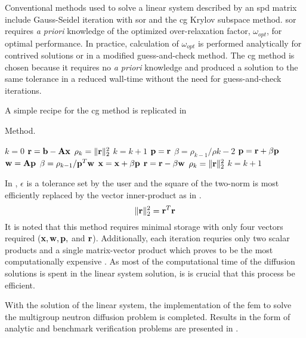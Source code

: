     Conventional methods used to solve a linear system described by an \gls{spd}
    matrix include Gauss-Seidel iteration with \gls{sor} and the \gls{cg} Krylov 
    subspace method. \gls{sor} requires \textit{a priori} knowledge of the 
    optimized over-relaxation factor, $\omega_{opt}$, for optimal performance. 
    In practice, calculation of $\omega_{opt}$ is performed analytically for 
    contrived solutions or in a modified guess-and-check method. The \gls{cg} 
    method is chosen because it requires no \textit{a priori} knowledge and
    produced a solution to the same tolerance in a reduced wall-time without the
    need for guess-and-check iterations.
    
    A simple recipe for the \gls{cg} method is replicated in
     \cite{Kelley1995IterativeEquations}
    
    \begin{algorithm}
      \caption{ Method.}
      \label{algorithm:CG}
      \begin{algorithmic}[1]
        \State $k = 0$
        \State $\mathbf{r} = \mathbf{b} - \mathbf{A} \mathbf{x}$
        \State $\rho_k = \|\mathbf{r}\|_2^2$
        \State $k = k + 1$
            \State $\mathbf{p} = \mathbf{r}$
          \Else
            \State $\beta = \rho_{k-1} / \rho{k-2}$
            \State $\mathbf{p} = \mathbf{r} + \beta \mathbf{p}$
          \EndIf
          \State $\mathbf{w} = \mathbf{A} \mathbf{p}$
          \State $\beta = \rho_{k-1} / \mathbf{p}^{T} \mathbf{w}$
          \State $\mathbf{x} = \mathbf{x} + \beta \mathbf{p}$
          \State $\mathbf{r} = \mathbf{r} - \beta \mathbf{w}$
          \State $\rho_k = \| \mathbf{r} \|_2^2$
          \State $k=k+1$
        \EndWhile
      \end{algorithmic}
    \end{algorithm}
    
    In , $\epsilon$ is a tolerance set by the user 
    and the square of the two-norm is most efficiently replaced by the vector
    inner-product as in . 
    \begin{equation}
      \label{eq:two_norm_inner}
      \|\mathbf{r}\|_2^2 = \mathbf{r}^{T} \mathbf{r}
    \end{equation}
    It is noted that this method requires minimal storage with only four vectors 
    required ($\mathbf{x}, \mathbf{w}, \mathbf{p},$ and $\mathbf{r}$). Additionally, each iteration requries
    only two scalar products and a single matrix-vector product which proves to
    be the most computationally expensive \cite{Kelley1995IterativeEquations}.
    As most of the computational time of the diffusion solutions is spent in the
    linear system solution, is is crucial that this process be efficient.

    With the solution of the linear system, the implementation of the \gls{fem}
    to solve the multigroup neutron diffusion problem is completed. Results in 
    the form of analytic and benchmark verification problems are presented in
    .
